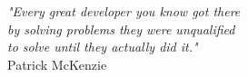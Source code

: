 
\hspace{0pt}
\vspace{3cm}

{
\begin{adjustwidth}{0pt}{-0.5cm}
	\begin{flushright}
		\textit{"Every great developer you know got there  	\\
				 by solving problems they were unqualified  \\
				 to solve until they actually did it." }	\\
		\vspace{0.4cm}
		Patrick McKenzie
	\end{flushright}
\end{adjustwidth}
}

